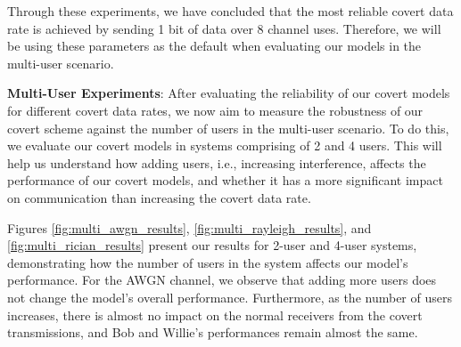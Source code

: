 Through these experiments, we have concluded that the most reliable covert data rate is achieved by sending 1 bit of data over 8 channel uses. Therefore, we will be using these parameters as the default when evaluating our models in the multi-user scenario.

\textbf{Multi-User Experiments}: 
After evaluating the reliability of our covert models for different covert data rates, we now aim to measure the robustness of our covert scheme against the number of users in the multi-user scenario. To do this, we evaluate our covert models in systems comprising of 2 and 4 users. This will help us understand how adding users, i.e., increasing interference, affects  the performance of our covert models, and whether it has a more significant impact on communication than increasing the covert data rate.

Figures \ref{fig:multi_awgn_results}, \ref{fig:multi_rayleigh_results}, and \ref{fig:multi_rician_results} present our results for 2-user and 4-user systems, demonstrating how the number of users in the system affects our model's performance. For the AWGN channel, we observe that adding more users does not change the model's overall performance. Furthermore, as the number of users increases, there is almost no impact on the normal receivers from the covert transmissions, and Bob and Willie's performances remain almost the same.

